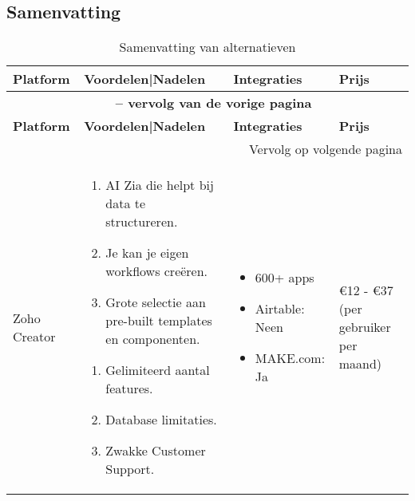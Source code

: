 \subsection{Samenvatting}%
\label{subsec:samenvatting}
\begin{longtable}{p{2.5cm} p{5.5cm} p{3.5cm} p{2.5cm}}
    \caption{Samenvatting van alternatieven} \label{samenvatting-alternatieven} \\
    \toprule
    \textbf{Platform} & \textbf{Voordelen|Nadelen} & \textbf{Integraties} & \textbf{Prijs} \\
    \midrule
    \endfirsthead

    \multicolumn{4}{c}{{\bfseries \tablename\ \thetable{} -- vervolg van de vorige pagina}} \\
    \toprule
    \textbf{Platform} & \textbf{Voordelen|Nadelen} & \textbf{Integraties} & \textbf{Prijs} \\
    \midrule
    \endhead

    \midrule
    \multicolumn{4}{r}{{Vervolg op volgende pagina}} \\
    \endfoot

    \bottomrule
    \endlastfoot

    Zoho Creator &
    \vspace{-\topsep}\vspace{-\partopsep} 
    \begin{enumerate}[leftmargin=2pt, topsep=0pt,parsep=0pt,noitemsep]
        \item[] AI Zia die helpt bij data te structureren.
        \item[] Je kan je eigen workflows creëren.
        \item[] Grote selectie aan pre-built templates en componenten.
    \end{enumerate}
    \begin{enumerate}[leftmargin=2pt, topsep=8pt,parsep=0pt,noitemsep]
        \item[] Gelimiteerd aantal features.
        \item[] Database limitaties.
        \item[] Zwakke Customer Support.
    \end{enumerate}
    & 
    \vspace{-\topsep}\vspace{-\partopsep} 
    \begin{itemize}[leftmargin=2pt, topsep=0pt,parsep=0pt,noitemsep]
        \item[] 600+ apps
        \item[] Airtable: Neen
        \item[] MAKE.com: Ja
    \end{itemize}
     &
    €12 - €37 (per gebruiker per maand)\\


\end{longtable}
